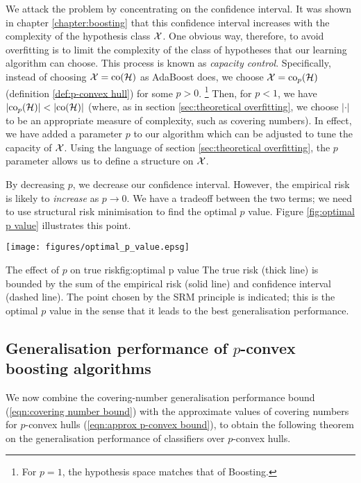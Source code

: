 We attack the problem by concentrating on the confidence interval.
It was shown in chapter \ref{chapter:boosting} that this confidence
interval increases with the complexity of the hypothesis class
$\mathcal{X}$.  One obvious way, therefore, to avoid overfitting is to limit
the complexity of the class of hypotheses that our learning algorithm
can choose.  This process is known as \emph{capacity control}.
Specifically, instead of choosing $\mathcal{X} = \mathrm{co} (\mathcal{H})$ as AdaBoost
does, we choose $\mathcal{X} = \mathrm{co}_p(\mathcal{H})$ (definition \ref{def:p-convex
hull}) for some $p > 0$.%
\footnote{For $p=1$, the hypothesis space matches that of Boosting.}
Then, for $p < 1$, we have $|\mathrm{co}_p (\mathcal{H})| < |\mathrm{co} (\mathcal{H})|$ (where,
as in section \ref{sec:theoretical overfitting}, we choose $|\cdot|$ to
be an appropriate measure of complexity, such as covering numbers).
In effect, we have added a parameter $p$ to our algorithm which can be
adjusted to tune the capacity of $\mathcal{X}$.  Using the language of
section \ref{sec:theoretical overfitting}, the $p$ parameter allows us
to define a structure on $\mathcal{X}$.

By decreasing $p$, we decrease our confidence interval.  However, the
empirical risk is likely to \emph{increase} as $p \rightarrow 0$.
We have a tradeoff between the two terms; we need to use structural
risk minimisation to find the optimal $p$ value.  Figure
\ref{fig:optimal p value} illustrates this point.

\begin{linefigure}
\begin{center}
\texttt{[image: figures/optimal\_p\_value.epsg]}
\end{center}
\begin{capt}{The effect of $p$ on true risk}{fig:optimal p value}
The true risk (thick line) is bounded by the sum of the empirical risk
(solid line) and confidence interval (dashed line).  The point chosen
by the SRM principle is indicated; this is the optimal $p$ value in
the sense that it leads to the best generalisation performance.
\end{capt}
\end{linefigure}

\subsection{Generalisation performance of $p$-convex boosting
algorithms}

We now combine the covering-number generalisation performance bound
(\ref{eqn:covering number bound}) with the approximate values of
covering numbers for $p$-convex hulls (\ref{eqn:approx p-convex
bound}), to obtain the following theorem on the generalisation
performance of classifiers over $p$-convex hulls.

